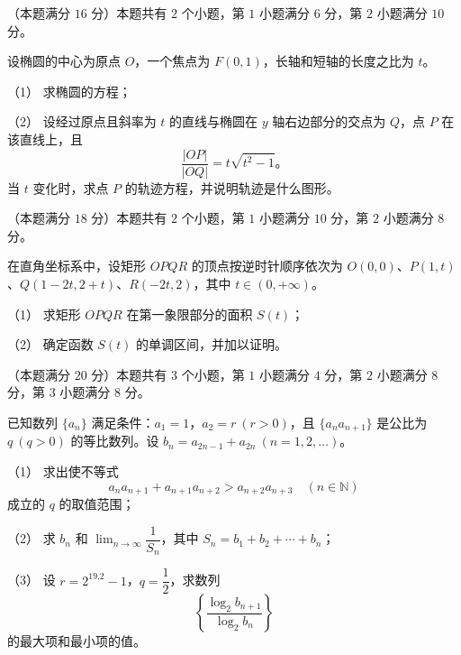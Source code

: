 \begin{question}
（本题满分 $16$ 分）本题共有 $2$ 个小题，第 $1$ 小题满分 $6$ 分，第 $2$ 小题满分 $10$ 分。

设椭圆的中心为原点 $O$，一个焦点为 $F(0,1)$，长轴和短轴的长度之比为 $t$。

（1） 求椭圆的方程；

（2） 设经过原点且斜率为 $t$ 的直线与椭圆在 $y$ 轴右边部分的交点为 $Q$，点 $P$ 在该直线上，且
\nopagebreak[4]
\[
\frac{|OP|}{|OQ|}=t\sqrt{t^2-1}\mbox{。}
\]
当 $t$ 变化时，求点 $P$ 的轨迹方程，并说明轨迹是什么图形。

\end{question}
\begin{question}
（本题满分 $18$ 分）本题共有 $2$ 个小题，第 $1$ 小题满分 $10$ 分，第 $2$ 小题满分 $8$ 分。

在直角坐标系中，设矩形 $OPQR$ 的顶点按逆时针顺序依次为 $O(0,0)$、$P(1,t)$、$Q(1-2t,2+t)$、$R(-2t,2)$，其中 $t\in(0,+\infty)$。

（1） 求矩形 $OPQR$ 在第一象限部分的面积 $S(t)$；

（2） 确定函数 $S(t)$ 的单调区间，并加以证明。

\end{question}
\begin{question}
（本题满分 $20$ 分）本题共有 $3$ 个小题，第 $1$ 小题满分 $4$ 分，第 $2$ 小题满分 $8$ 分，第 $3$ 小题满分 $8$ 分。

已知数列 $\{a_n\}$ 满足条件：$a_1=1$，$a_2=r\ (r>0)$，且 $\{a_na_{n+1}\}$ 是公比为 $q\ (q>0)$ 的等比数列。设 $b_n=a_{2n-1}+a_{2n}\ (n=1,2,\ldots)$。

（1） 求出使不等式
\nopagebreak[4]
\[
a_na_{n+1}+a_{n+1}a_{n+2}>a_{n+2}a_{n+3}\quad(n\in\mathbb N)
\]
成立的 $q$ 的取值范围；

（2） 求 $b_n$ 和 $\displaystyle\lim_{n\to\infty}\dfrac1{S_n}$，其中 $S_n=b_1+b_2+\cdots+b_n$；

（3） 设 $r=2^{19.2}-1$，$q=\dfrac12$，求数列
\nopagebreak[4]
\[
\left\{\frac{\log_2 b_{n+1}}{\log_2 b_n}\right\}
\]
的最大项和最小项的值。

\end{question}